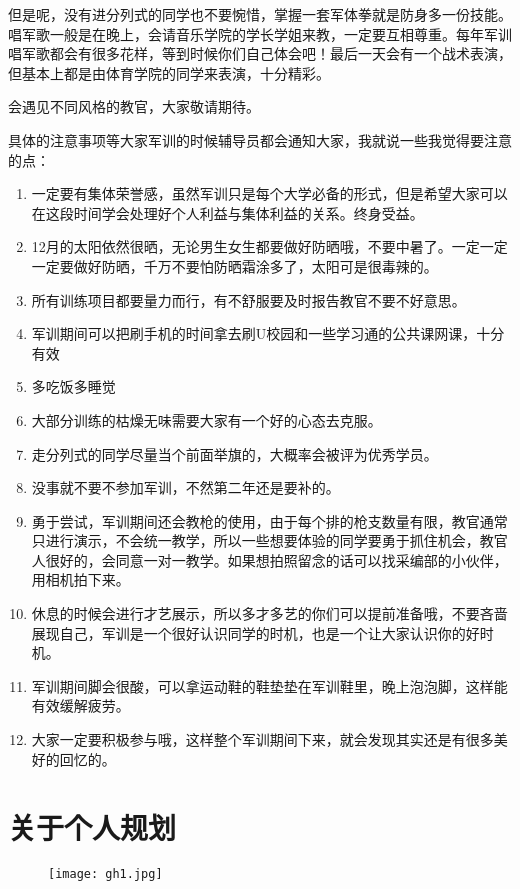 \documentclass{my_paper}
\begin{document}
但是呢，没有进分列式的同学也不要惋惜，掌握一套军体拳就是防身多一份技能。唱军歌一般是在晚上，会请音乐学院的学长学姐来教，一定要互相尊重。每年军训唱军歌都会有很多花样，等到时候你们自己体会吧！最后一天会有一个战术表演，但基本上都是由体育学院的同学来表演，十分精彩。

会遇见不同风格的教官，大家敬请期待。

具体的注意事项等大家军训的时候辅导员都会通知大家，我就说一些我觉得要注意的点：
\begin{enumerate}
    \item 一定要有集体荣誉感，虽然军训只是每个大学必备的形式，但是希望大家可以在这段时间学会处理好个人利益与集体利益的关系。终身受益。
    \item 12月的太阳依然很晒，无论男生女生都要做好防晒哦，不要中暑了。一定一定一定要做好防晒，千万不要怕防晒霜涂多了，太阳可是很毒辣的。
    \item 所有训练项目都要量力而行，有不舒服要及时报告教官不要不好意思。
    \item 军训期间可以把刷手机的时间拿去刷U校园和一些学习通的公共课网课，十分有效
    \item 多吃饭多睡觉
    \item 大部分训练的枯燥无味需要大家有一个好的心态去克服。
    \item 走分列式的同学尽量当个前面举旗的，大概率会被评为优秀学员。
    \item 没事就不要不参加军训，不然第二年还是要补的。
    \item 勇于尝试，军训期间还会教枪的使用，由于每个排的枪支数量有限，教官通常只进行演示，不会统一教学，所以一些想要体验的同学要勇于抓住机会，教官人很好的，会同意一对一教学。如果想拍照留念的话可以找采编部的小伙伴，用相机拍下来。
    \item 休息的时候会进行才艺展示，所以多才多艺的你们可以提前准备哦，不要吝啬展现自己，军训是一个很好认识同学的时机，也是一个让大家认识你的好时机。
    \item 军训期间脚会很酸，可以拿运动鞋的鞋垫垫在军训鞋里，晚上泡泡脚，这样能有效缓解疲劳。
    \item 大家一定要积极参与哦，这样整个军训期间下来，就会发现其实还是有很多美好的回忆的。
\end{enumerate}


\section{关于个人规划}
\begin{figure}[htbp]
	\centering
	\texttt{[image: gh1.jpg]}
\end{figure} 
\end{document}
